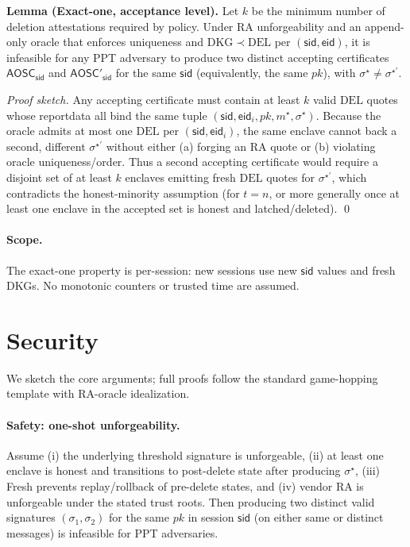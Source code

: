 \documentclass[runningheads,orivec]{llncs}
\newcommand{\sid}{\mathsf{sid}}
\begin{document}
\noindent\textbf{Lemma (Exact-one, acceptance level).}
Let $k$ be the minimum number of deletion attestations required by policy. Under RA unforgeability and an append-only oracle that enforces uniqueness and $\mathrm{DKG}\!\prec\!\mathrm{DEL}$ per $(\sid,\mathsf{eid})$, it is infeasible for any PPT adversary to produce two distinct accepting certificates
$\mathsf{AOSC}_\sid$ and $\mathsf{AOSC}'_\sid$ for the same $\sid$ (equivalently, the same $pk$), with $\sigma^{\star}\neq\sigma^{\star'}$.

\emph{Proof sketch.} Any accepting certificate must contain at least $k$ valid $\mathrm{DEL}$ quotes whose reportdata all bind the same tuple $(\sid,\mathsf{eid}_i,pk,m^{\star},\sigma^{\star})$. Because the oracle admits at most one $\mathrm{DEL}$ per $(\sid,\mathsf{eid}_i)$, the same enclave cannot back a second, different $\sigma^{\star'}$ without either (a) forging an RA quote or (b) violating oracle uniqueness/order. Thus a second accepting certificate would require a disjoint set of at least $k$ enclaves emitting fresh $\mathrm{DEL}$ quotes for $\sigma^{\star'}$, which contradicts the honest-minority assumption (for $t\!=\!n$, or more generally once at least one enclave in the accepted set is honest and latched/deleted). \qed

\paragraph{Scope.}
The exact-one property is per-session: new sessions use new $\sid$ values and fresh DKGs. No monotonic counters or trusted time are assumed.

\section{Security}\label{sec:security}
We sketch the core arguments; full proofs follow the standard game-hopping template with RA-oracle idealization.

\paragraph{Safety: one-shot unforgeability.}
\begin{theorem}\label{thm:one-shot}
Assume (i) the underlying threshold signature is unforgeable, (ii) at least one enclave is honest and transitions to post-delete state after producing $\sigma^{\star}$, (iii) \textsf{Fresh} prevents replay/rollback of pre-delete states, and (iv) vendor RA is unforgeable under the stated trust roots. Then producing two distinct valid signatures $(\sigma_1,\sigma_2)$ for the same $pk$ in session $\mathsf{sid}$ (on either same or distinct messages) is infeasible for PPT adversaries.
\end{theorem}
\end{document}
